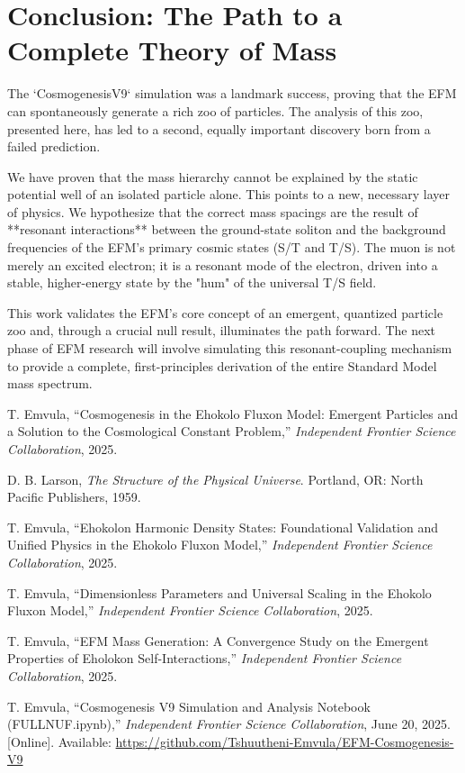 \documentclass[11pt, twoside]{article}
\begin{document}
\section{Conclusion: The Path to a Complete Theory of Mass}
The `CosmogenesisV9` simulation was a landmark success, proving that the EFM can spontaneously generate a rich zoo of particles. The analysis of this zoo, presented here, has led to a second, equally important discovery born from a failed prediction.

We have proven that the mass hierarchy cannot be explained by the static potential well of an isolated particle alone. This points to a new, necessary layer of physics. We hypothesize that the correct mass spacings are the result of **resonant interactions** between the ground-state soliton and the background frequencies of the EFM's primary cosmic states (S/T and T/S). The muon is not merely an excited electron; it is a resonant mode of the electron, driven into a stable, higher-energy state by the "hum" of the universal T/S field.

This work validates the EFM's core concept of an emergent, quantized particle zoo and, through a crucial null result, illuminates the path forward. The next phase of EFM research will involve simulating this resonant-coupling mechanism to provide a complete, first-principles derivation of the entire Standard Model mass spectrum.


\begin{thebibliography}{9}
\raggedright

T. Emvula, ``Cosmogenesis in the Ehokolo Fluxon Model: Emergent Particles and a Solution to the Cosmological Constant Problem,'' \textit{Independent Frontier Science Collaboration}, 2025.

D. B. Larson, \textit{The Structure of the Physical Universe}. Portland, OR: North Pacific Publishers, 1959.

T. Emvula, ``Ehokolon Harmonic Density States: Foundational Validation and Unified Physics in the Ehokolo Fluxon Model,'' \textit{Independent Frontier Science Collaboration}, 2025.

T. Emvula, ``Dimensionless Parameters and Universal Scaling in the Ehokolo Fluxon Model,'' \textit{Independent Frontier Science Collaboration}, 2025.

T. Emvula, ``EFM Mass Generation: A Convergence Study on the Emergent Properties of Eholokon Self-Interactions,'' \textit{Independent Frontier Science Collaboration}, 2025.

T. Emvula, ``Cosmogenesis V9 Simulation and Analysis Notebook (FULLNUF.ipynb),'' \textit{Independent Frontier Science Collaboration}, June 20, 2025. [Online]. Available: \url{https://github.com/Tshuutheni-Emvula/EFM-Cosmogenesis-V9}

\end{thebibliography}
\end{document}
